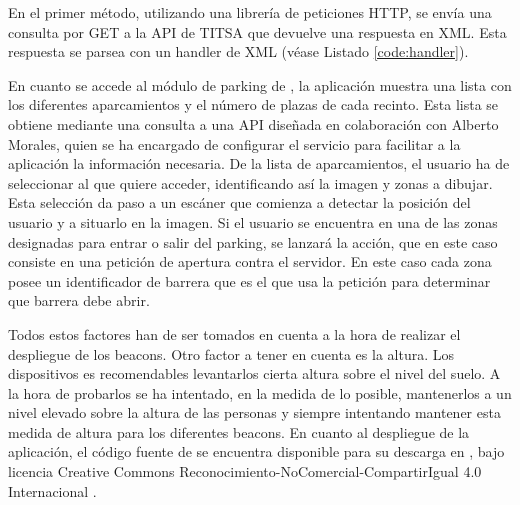 En el primer método, utilizando una librería de peticiones HTTP, se envía una consulta por GET a la API de TITSA que devuelve una respuesta en XML. Esta respuesta se parsea con un handler de XML (véase Listado \ref{code:handler}). 
\vspace{5mm}



En cuanto se accede al módulo de parking de \BulletPoint{}, la aplicación muestra una lista con los diferentes aparcamientos y el número de plazas de cada recinto. Esta lista se obtiene mediante una consulta a una API diseñada en colaboración con Alberto Morales, quien se ha encargado de configurar el servicio para facilitar a la aplicación la información necesaria. De la lista de aparcamientos, el usuario ha de seleccionar al que quiere acceder, identificando así la imagen y zonas a dibujar. Esta selección da paso a un escáner que comienza a detectar la posición del usuario y a situarlo en la imagen. Si el usuario se encuentra en una de las zonas designadas para entrar o salir del parking, se lanzará la acción, que en este caso consiste en una petición de apertura contra el servidor. En este caso cada zona posee un identificador de barrera que es el que usa la petición para determinar que barrera debe abrir. 


Todos estos factores han de ser tomados en cuenta a la hora de realizar el despliegue de los beacons. Otro factor a tener en cuenta es la altura. Los dispositivos es recomendables levantarlos cierta altura sobre el nivel del suelo. A la hora de probarlos se ha intentado, en la medida de lo posible, mantenerlos a un nivel elevado sobre la altura de las personas y siempre intentando mantener esta medida de altura para los diferentes beacons. En cuanto al despliegue de la aplicación, el código fuente de \BulletPoint{} se encuentra disponible para su descarga en \cite{URL::repositorioAplicacion}, bajo licencia Creative Commons Reconocimiento-NoComercial-CompartirIgual 4.0 Internacional \cite{URL::licencia}.





